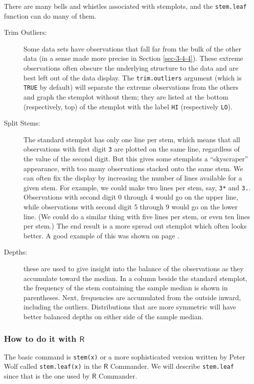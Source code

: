 \documentclass[captions=tableheading]{scrbook}
\begin{document}
There are many bells and whistles associated with stemplots, and the \texttt{stem.leaf} function can do many of them.

\begin{description}
\item[Trim Outliers:] Some data sets have observations that fall far from the bulk of the other data (in a sense made more precise in Section \ref{sec-3-4-4}). These extreme observations often obscure the underlying structure to the data and are best left out of the data display. The \texttt{trim.outliers} argument (which is \texttt{TRUE} by default) will separate the extreme observations from the others and graph the stemplot without them; they are listed at the bottom (respectively, top) of the stemplot with the label \texttt{HI} (respectively \texttt{LO}).
\item[Split Stems:] The standard stemplot has only one line per stem, which means that all observations with first digit \texttt{3} are plotted on the same line, regardless of the value of the second digit. But this gives some stemplots a ``skyscraper'' appearance, with too many observations stacked onto the same stem. We can often fix the display by increasing the number of lines available for a given stem. For example, we could make two lines per stem, say, \texttt{3*} and \texttt{3.}. Observations with second digit 0 through 4 would go on the upper line, while observations with second digit 5 through 9 would go on the lower line. (We could do a similar thing with five lines per stem, or even ten lines per stem.) The end result is a more spread out stemplot which often looks better. A good example of this was shown on page \pageref{exa-stemleaf-multiple-lines-stem}.
\item[Depths:] these are used to give insight into the balance of the observations as they accumulate toward the median. In a column beside the standard stemplot, the frequency of the stem containing the sample median is shown in parentheses. Next, frequencies are accumulated from the outside inward, including the outliers. Distributions that are more symmetric will have better balanced depths on either side of the sample median.
\end{description}
\subsubsection{How to do it with \(\mathsf{R}\)}
\label{sec-3-4-1-1}


The basic command is \texttt{stem(x)} or a more sophisticated version written by Peter Wolf called \texttt{stem.leaf(x)} in the \(\mathsf{R}\) Commander. We will describe \texttt{stem.leaf} since that is the one used by \(\mathsf{R}\) Commander.
\end{document}
